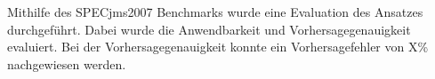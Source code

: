Mithilfe des SPECjms2007 Benchmarks wurde eine Evaluation des Ansatzes durchgeführt. Dabei wurde die Anwendbarkeit und Vorhersagegenauigkeit evaluiert. Bei der Vorhersagegenauigkeit konnte ein Vorhersagefehler von X\% nachgewiesen werden.